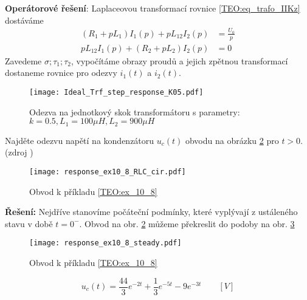 \begin{example}
       \textbf{Operátorové řešení}: Laplaceovou transformací rovnice \ref{TEO:eq_trafo_IIKz}
       dostáváme
       \begin{align}\label{TEO:eq_trafo_laplace}
         (R_1 + pL_1)I_1(p)+pL_{12}I_2(p)   &= \frac{U_0}{p} \\
         pL_{12}I_1(p) + (R_2 + pL_2)I_2(p) &= 0
       \end{align}
       Zavedeme $\sigma; \tau_1; \tau_2$, vypočítáme obrazy proudů a jejich zpětnou transformací
       do\-sta\-ne\-me rovnice pro odezvy $i_1(t)$ a $i_2(t)$.
         \begin{figure}[ht!]
           \centering
           \texttt{[image: Ideal\_Trf\_step\_response\_K05.pdf]}
           \caption[Odezva transformátoru na jednotkový skok]{Odezva na jednotkový skok
                    transformátoru s parametry: $k=0.5, L_1 = 100 \mu H, L_2 = 900 \mu H$}
           \label{figure:trafo_int_uprim}
         \end{figure}
       \end{example}

       \begin{example}\label{TEO:ex_10_8} Najděte odezvu napětí na kondenzátoru $u_c(t)$ obvodu na
         obrázku \ref{TEO:fig_cir_10_8} pro $t>0$. (zdroj \cite[s.~456]{Dorf}) 
         \begin{figure}[ht!]
           \centering
           \texttt{[image: response\_ex10\_8\_RLC\_cir.pdf]}
           \caption[K příkladu \ref{TEO:ex_10_8}]{Obvod k příkladu \ref{TEO:ex_10_8}}
           \label{TEO:fig_cir_10_8}
         \end{figure}

         \textbf{Řešení:} Nejdříve stanovíme počáteční podmínky, které vyplývají z ustáleného stavu
         v době $t = 0^-$. Obvod na obr. \ref{TEO:fig_cir_10_8} můžeme překreslit do podoby na obr.
         \ref{TEO:fig_cir_10_8_steady} 
         \begin{figure}[ht!]
           \centering
           \texttt{[image: response\_ex10\_8\_steady.pdf]}
           \caption[K příkladu \ref{TEO:ex_10_8}]{Obvod k příkladu \ref{TEO:ex_10_8}}
           \label{TEO:fig_cir_10_8_steady}
         \end{figure}
         \begin{equation}\label{TEO:eq_10_8_vysledek}
            u_c(t) = \frac{44}{3}e^{-2t}+\frac{1}{3}e^{-5t} - 9e^{-3t} \qquad [V]
         \end{equation}
       \end{example} 
       
